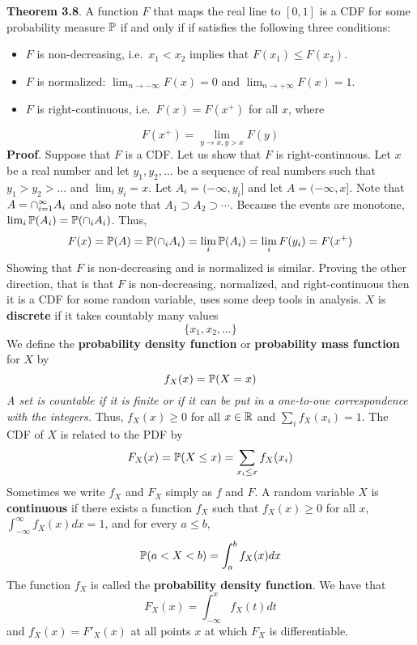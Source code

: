 \textbf{Theorem 3.8}. A function \(F\) that maps the real line to \([0, 1]\) is a CDF for some probability measure \(\operatorname{\mathbb{P}}\) if and only if if satisfies the following three conditions:
\begin{itemize}[tightlist]
\item
  \(F\) is non-decreasing, i.e.~\(x_{1} < x_{2}\) implies that
  \(F(x_{1}) \leq F(x_{2})\).
\item
  \(F\) is normalized: \(\lim_{n \rightarrow -\infty} F(x) = 0\) and
  \(\lim_{n \rightarrow +\infty} F(x) = 1\).
\item
  \(F\) is right-continuous, i.e.~\(F(x) = F(x^+)\) for all \(x\), where
\end{itemize}
\[
F(x^+) = \lim_{y \rightarrow x, y > x} F(y)
\]
\textbf{Proof}. Suppose that \(F\) is a CDF. Let us show that \(F\) is right-continuous. Let \(x\) be a real number and let \(y_{1}, y_{2}, \dots\) be a sequence of real numbers such that \(y_{1} > y_{2} > \dots\) and \(\lim_{i} y_{i} = x\). Let \(A_{i} = (-\infty, y_{i}]\) and let \(A = (-\infty, x]\). Note that \(A = \cap_{i=1}^{\infty} A_{i}\) and also note that \(A_{1} \supset A_{2} \supset \cdots\). Because the events are monotone, \(\lim_{i} \operatorname{\mathbb{P}}(A_{i}) = \operatorname{\mathbb{P}}(\cap_{i} A_{i})\). Thus,
\[
F(x) = \operatorname{\mathbb{P}}(A) = \operatorname{\mathbb{P}}(\cap_{i} A_{i}) = \lim_{i} \operatorname{\mathbb{P}}(A_{i}) = \lim_{i} F(y_{i}) = F(x^+)
\]
Showing that \(F\) is non-decreasing and is normalized is similar. Proving the other direction, that is that \(F\) is non-decreasing, normalized, and right-continuous then it is a CDF for some random variable, uses some deep tools in analysis.
\(X\) is \textbf{discrete} if it takes countably many values
\[
\{ x_{1}, x_{2}, \dots \}
\]
We define the \textbf{probability density function} or
\textbf{probability mass function} for \(X\) by
\[
f_X(x) = \operatorname{\mathbb{P}}(X = x)
\]
\emph{A set is countable if it is finite or if it can be put in a one-to-one correspondence with the integers.}
Thus, \(f_X(x) \geq 0\) for all \(x \in \mathbb{R}\) and \(\sum_{i} f_X(x_{i}) = 1\). The CDF of \(X\) is related to the PDF by
\[
F_X(x) = \operatorname{\mathbb{P}}(X \leq x) = \sum_{x_{i} \leq x} f_X(x_{i})
\]
Sometimes we write \(f_X\) and \(F_X\) simply as \(f\) and \(F\).
A random variable \(X\) is \textbf{continuous} if there exists a function \(f_X\) such that \(f_X(x) \geq 0\) for all \(x\), \(\int_{-\infty}^{\infty} f_X(x) dx = 1\), and for every \(a \leq b\),
\[
\operatorname{\mathbb{P}}(a < X < b) = \int_a^{b} f_X(x) dx
\]
The function \(f_X\) is called the \textbf{probability density function}. We have that
\[
F_X(x) = \int_{-\infty}^x f_X(t) dt
\]
and \(f_X(x) = F'_X(x)\) at all points \(x\) at which \(F_X\) is differentiable.
